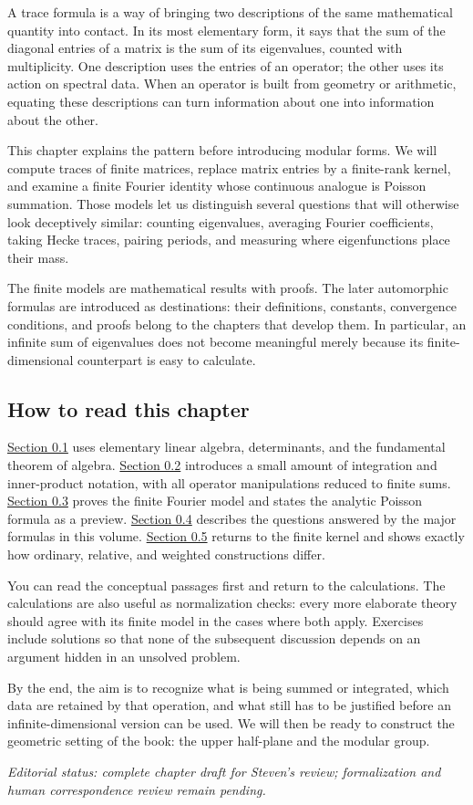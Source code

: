 A trace formula is a way of bringing two descriptions of the same mathematical quantity into contact. In its most elementary form, it says that the sum of the diagonal entries of a matrix is the sum of its eigenvalues, counted with multiplicity. One description uses the entries of an operator; the other uses its action on spectral data. When an operator is built from geometry or arithmetic, equating these descriptions can turn information about one into information about the other.

This chapter explains the pattern before introducing modular forms. We will compute traces of finite matrices, replace matrix entries by a finite-rank kernel, and examine a finite Fourier identity whose continuous analogue is Poisson summation. Those models let us distinguish several questions that will otherwise look deceptively similar: counting eigenvalues, averaging Fourier coefficients, taking Hecke traces, pairing periods, and measuring where eigenfunctions place their mass.

The finite models are mathematical results with proofs. The later automorphic formulas are introduced as destinations: their definitions, constants, convergence conditions, and proofs belong to the chapters that develop them. In particular, an infinite sum of eigenvalues does not become meaningful merely because its finite-dimensional counterpart is easy to calculate.

\subsection*{How to read this chapter}

\hyperref[v1a-ch00-s1]{Section 0.1} uses elementary linear algebra, determinants, and the fundamental theorem of algebra. \hyperref[v1a-ch00-s2]{Section 0.2} introduces a small amount of integration and inner-product notation, with all operator manipulations reduced to finite sums. \hyperref[v1a-ch00-s3]{Section 0.3} proves the finite Fourier model and states the analytic Poisson formula as a preview. \hyperref[v1a-ch00-s4]{Section 0.4} describes the questions answered by the major formulas in this volume. \hyperref[v1a-ch00-s5]{Section 0.5} returns to the finite kernel and shows exactly how ordinary, relative, and weighted constructions differ.

You can read the conceptual passages first and return to the calculations. The calculations are also useful as normalization checks: every more elaborate theory should agree with its finite model in the cases where both apply. Exercises include solutions so that none of the subsequent discussion depends on an argument hidden in an unsolved problem.

By the end, the aim is to recognize what is being summed or integrated, which data are retained by that operation, and what still has to be justified before an infinite-dimensional version can be used. We will then be ready to construct the geometric setting of the book: the upper half-plane and the modular group.

\textit{Editorial status: complete chapter draft for Steven's review; formalization and human correspondence review remain pending.}

